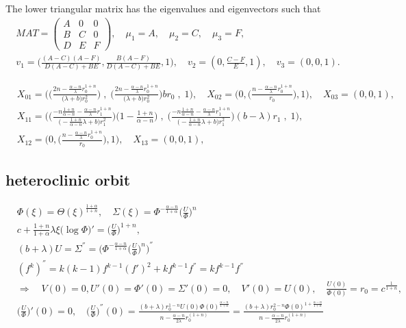 \documentclass[a4paper,11pt]{article}
\begin{document}
The lower triangular matrix has the eigenvalues and eigenvectors such that
\begin{align*}
 MAT = \begin{pmatrix}
        A & 0 & 0\\
        B & C & 0\\
        D & E & F
       \end{pmatrix}, \quad
 \mu_1 = A, \quad\mu_2 = C, \quad\mu_3 = F,\\
 v_1 = \Big( \frac{ (A-C)(A-F) }{ D(A-C) + BE }, \frac{ B(A-F) }{ D(A-C) + BE }, 1), \quad  v_2 = (0, \frac{C-F}{E}, 1), \quad v_3 = (0,0,1).
\end{align*}

\begin{align*}
 &X_{01} = \bigg( \Big( \frac{2n - \frac{\alpha-n}{\lambda}r_0^{1+n}}{\big({\lambda}+b\big) r_0^2}\Big) \;,\;\Big( \frac{2n - \frac{\alpha-n}{\lambda}r_0^{1+n}}{\big({\lambda}+b\big) r_0^2}\Big)br_0\;,\;1\bigg),\quad 
 X_{02} = \bigg(0, \Big(\frac{n- \frac{\alpha-n}{\lambda}r_0^{1+n}}{r_0}\Big), 1\bigg), \quad
 X_{03} = (0,0,1),\\
 &X_{11} = \bigg(  \Big(\frac{-n\frac{1+n}{\alpha-n} - \frac{\alpha-n}{\lambda}r_1^{1+n}}{\big(-\frac{1+n}{\alpha-n} \lambda +b\big) r_1^2}\Big)\Big(1-\frac{1+n}{\alpha-n}\Big) \;,\;\Big(\frac{-n\frac{1+n}{\alpha-n} - \frac{\alpha-n}{\lambda}r_1^{1+n}}{\big(-\frac{1+n}{\alpha-n} \lambda +b\big) r_1^2}\Big)(b-\lambda)r_1\;,\;1\bigg),\\ 
 &X_{12} = \bigg(0, \Big(\frac{n- \frac{\alpha-n}{\lambda}r_0^{1+n}}{r_0}\Big), 1\bigg), \quad
 X_{13} = (0,0,1), 
\end{align*}

\subsection{heteroclinic orbit}
\begin{align*}
  &\Phi(\xi) = \Theta(\xi)^{\frac{1+\alpha}{1+n}}, \quad \Sigma(\xi) = \Phi^{-\frac{\alpha-n}{1+\alpha}} \Big(\frac{U}{\Phi}\Big)^n\\
  &c + \frac{1+n}{1+\alpha} \lambda \xi \big(\log\Phi\big)' = \Big(\frac{U}{\Phi}\Big)^{1+n},\\
  &(b+\lambda)U = \Sigma^{''} = \Big(\Phi^{-\frac{\alpha-n}{1+\alpha}}\Big(\frac{U}{\Phi}\Big)^{n}\Big)^{''}\\
  &(f^k)^{''} = k(k-1)f^{k-1}(f')^2 + kf^{k-1}f^{''} = kf^{k-1}f^{''}\\
  &\Longrightarrow  \quad V(0)=0, U'(0)=\Phi'(0)=\Sigma'(0)=0, \quad V'(0)=U(0),\quad \frac{U(0)}{\Phi(0)} = r_0 = c^{\frac{1}{1+n}},\\
  &\Big(\frac{U}{\Phi}\Big)'(0)=0, \quad \Big(\frac{U}{\Phi}\Big)^{''}(0) = \frac{ (b+\lambda) r_0^{1-n} U(0)\Phi(0)^{\frac{\alpha-n}{1+\alpha}} }{ n - \frac{\alpha-n}{2\lambda}r_0^{(1+n)}} = \frac{ (b+\lambda) r_0^{2-n} \Phi(0)^{1+\frac{\alpha-n}{1+\alpha}} }{ n - \frac{\alpha-n}{2\lambda}r_0^{(1+n)}}\\
\end{align*}
\end{document}
